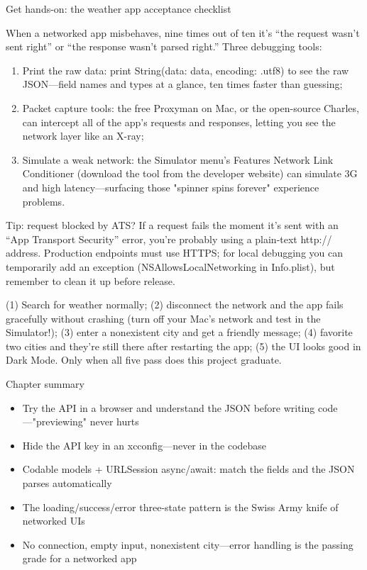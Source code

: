 \begin{tcbpractice}{Get hands-on: the weather app acceptance checklist}

When a networked app misbehaves, nine times out of ten it's “the request wasn't sent right” or “the response wasn't parsed right.” Three debugging tools:

\begin{enumerate}
  \item Print the raw data: print String(data: data, encoding: .utf8) to see the raw JSON—field names and types at a glance, ten times faster than guessing;
  \item Packet capture tools: the free Proxyman on Mac, or the open-source Charles, can intercept all of the app's requests and responses, letting you see the network layer like an X-ray;
  \item Simulate a weak network: the Simulator menu's Features Network Link Conditioner (download the tool from the developer website) can simulate 3G and high latency—surfacing those "spinner spins forever" experience problems.
\end{enumerate}

\begin{tcbinfo}{Tip: request blocked by ATS?}
If a request fails the moment it's sent with an “App Transport Security” error, you're probably using a plain-text http:// address. Production endpoints must use HTTPS; for local debugging you can temporarily add an exception (NSAllowsLocalNetworking in Info.plist), but remember to clean it up before release.

\end{tcbinfo}

(1) Search for weather normally; (2) disconnect the network and the app fails gracefully without crashing (turn off your Mac's network and test in the Simulator!); (3) enter a nonexistent city and get a friendly message; (4) favorite two cities and they're still there after restarting the app; (5) the UI looks good in Dark Mode. Only when all five pass does this project graduate.

\end{tcbpractice}

\begin{tcbsummary}{Chapter summary}
\begin{itemize}
  \item Try the API in a browser and understand the JSON before writing code—"previewing" never hurts
  \item Hide the API key in an xcconfig—never in the codebase
  \item Codable models + URLSession async/await: match the fields and the JSON parses automatically
  \item The loading/success/error three-state pattern is the Swiss Army knife of networked UIs
  \item No connection, empty input, nonexistent city—error handling is the passing grade for a networked app
\end{itemize}

\end{tcbsummary}
